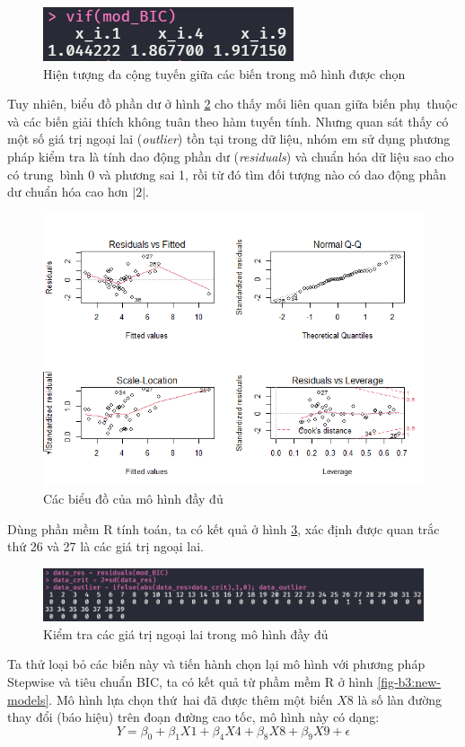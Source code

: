 \begin{figure}[H]
	\centering
	\includegraphics[width=0.35\linewidth]{images/B3/model-bic-vif}
	\caption{Hiện tượng đa cộng tuyến giữa các biến trong mô hình được chọn}
	\label{fig-b3:model-bic-vif}
\end{figure}

Tuy nhiên, biểu đồ phần dư ở hình \ref{fig-b3:model-full-plot} cho thấy mối liên quan giữa biến phụ~thuộc và các biến giải thích không tuân theo hàm tuyến tính. Nhưng quan sát thấy có một số giá trị ngoại lai (\textit{outlier}) tồn tại trong dữ liệu, nhóm em sử dụng phương pháp kiểm tra là tính dao động phần dư (\textit{residuals}) và chuẩn hóa dữ liệu sao cho có trung~bình 0 và phương sai 1, rồi từ đó tìm đối tượng nào có dao động phần dư chuẩn hóa cao hơn $|2|$. 
\begin{figure}[H]
	\centering
	\includegraphics[width=0.65\linewidth]{images/B3/model-full-plot}
	\caption{Các biểu đồ của mô hình đầy đủ}
	\label{fig-b3:model-full-plot}
\end{figure}

Dùng phần mềm R tính toán, ta có kết quả ở hình \ref{fig-b3:dataset-outlier}, xác định được quan trắc thứ 26 và 27 là các giá trị ngoại lai.
\begin{figure}[H]
	\centering
	\includegraphics[width=0.7\linewidth]{images/B3/dataset-outlier}
	\caption{Kiểm tra các giá trị ngoại lai trong mô hình đầy đủ}
	\label{fig-b3:dataset-outlier}
\end{figure}

Ta thử loại bỏ các biến này và tiến hành chọn lại mô hình với phương pháp Stepwise và tiêu chuẩn BIC, ta có kết quả từ phầm mềm R ở hình \ref{fig-b3:new-models}. Mô hình lựa chọn thứ~hai đã được thêm một biến $X8$ là số làn đường thay đổi (báo hiệu) trên đoạn đường cao tốc, mô hình này có dạng:
\begin{equation}\label{b3-new-model-bic}
	Y = \beta_0 + \beta_1X1 + \beta_4X4 + \beta_8X8 + \beta_9X9 + \epsilon
\end{equation}

